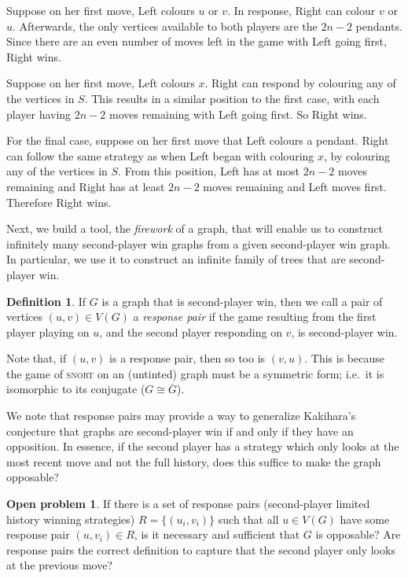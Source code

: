 \documentclass[11pt]{article}
\theoremstyle{definition}
\newtheorem{definition}[theorem]{Definition}
\newtheorem{problem}[theorem]{Open problem}
\begin{document}
Suppose on her first move, Left colours $u$ or $v$. In response, Right can
colour $v$ or $u$. Afterwards, the only vertices available to both players are
the $2n-2$ pendants. Since there are an even number of moves left in the game
with Left going first, Right wins.

Suppose on her first move, Left colours $x$. Right can respond by colouring any
of the vertices in $S$. This results in a similar position to the first case,
with each player having $2n-2$ moves remaining with Left going first. So Right
wins.

For the final case, suppose on her first move that Left colours a pendant.
Right can follow the same strategy as when Left began with colouring $x$, by
colouring any of the vertices in $S$. From this position, Left has at most
$2n-2$ moves remaining and Right has at least $2n-2$ moves remaining and Left
moves first. Therefore Right wins.

Next, we build a tool, the \emph{firework} of a graph, that will enable us to
construct infinitely many second-player win graphs from a given second-player
win graph. In particular, we use it to construct an infinite family of trees
that are second-player win.

\begin{definition}
    If $G$ is a graph that is second-player win, then we call a pair of
    vertices $(u,v)\in V(G)$ a \emph{response pair} if the game resulting from
    the first player playing on $u$, and the second player responding on $v$,
    is second-player win.
\end{definition}

Note that, if $(u,v)$ is a response pair, then so too is $(v,u)$. This is
because the game of \textsc{snort} on an (untinted) graph must be a symmetric
form; i.e.\ it is isomorphic to its conjugate ($G\cong\overline{G}$).

We note that response pairs may provide a way to generalize Kakihara's
conjecture that graphs are second-player win if and only if they have an
opposition. In essence, if the second player has a strategy which only looks at
the most recent move and not the full history, does this suffice to make the
graph opposable? 

\begin{problem}
    If there is a set of response pairs (second-player limited history winning
    strategies) $R=\{(u_i,v_i)\}$ such that all $u\in V(G)$ have some response
    pair $(u,v_i)\in R$, is it necessary and sufficient that $G$ is opposable?
    Are response pairs the correct definition to capture that the second player
    only looks at the previous move? 
\end{problem}
\end{document}
